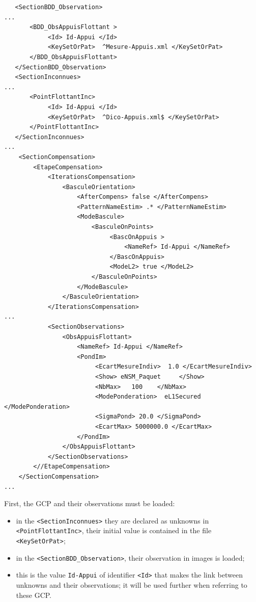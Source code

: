 {\scriptsize
\begin{verbatim}
   <SectionBDD_Observation>
...
       <BDD_ObsAppuisFlottant >
            <Id> Id-Appui </Id>
            <KeySetOrPat>  ^Mesure-Appuis.xml </KeySetOrPat>
       </BDD_ObsAppuisFlottant>
   </SectionBDD_Observation>
   <SectionInconnues>
...
       <PointFlottantInc>
            <Id> Id-Appui </Id>
            <KeySetOrPat>  ^Dico-Appuis.xml$ </KeySetOrPat>
       </PointFlottantInc>
   </SectionInconnues>
...
    <SectionCompensation>
        <EtapeCompensation>
            <IterationsCompensation>
                <BasculeOrientation>
                    <AfterCompens> false </AfterCompens>
                    <PatternNameEstim> .* </PatternNameEstim>
                    <ModeBascule>
                        <BasculeOnPoints>
                             <BascOnAppuis >
                                 <NameRef> Id-Appui </NameRef>
                             </BascOnAppuis>
                             <ModeL2> true </ModeL2>
                        </BasculeOnPoints>
                    </ModeBascule>
                </BasculeOrientation>
            </IterationsCompensation>
...
            <SectionObservations>
                <ObsAppuisFlottant>
                    <NameRef> Id-Appui </NameRef>
                    <PondIm>
                         <EcartMesureIndiv>  1.0 </EcartMesureIndiv>
                         <Show> eNSM_Paquet     </Show>
                         <NbMax>   100    </NbMax>
                         <ModePonderation>  eL1Secured </ModePonderation>
                         <SigmaPond> 20.0 </SigmaPond>
                         <EcartMax> 5000000.0 </EcartMax>
                    </PondIm>
                </ObsAppuisFlottant>
            </SectionObservations>
        <//EtapeCompensation>
    </SectionCompensation>
...
\end{verbatim}
}

First, the GCP and their observations must be loaded:

\begin{itemize}
   \item in the {\tt <SectionInconnues>} they are declared as unknowns in {\tt <PointFlottantInc>},
         their initial value is contained in the file {\tt <KeySetOrPat>};

  \item  in the  {\tt <SectionBDD\_Observation>}, their observation in images is loaded;

   \item this is the value {\tt Id-Appui} of  identifier {\tt <Id>}
         that makes the link between unknowns and their observations; it will be used
         further when referring to these GCP.
\end{itemize}

